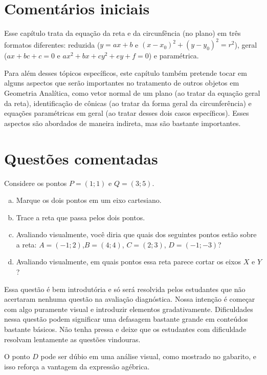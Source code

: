 \documentclass[main_estudante.tex]{subfiles}
\begin{document}
\section{Comentários iniciais}

Esse capítulo trata da equação da reta e da circunfência (no plano) em três formatos diferentes: reduzida ($y=ax+b$ e $(x-x_0)^2+(y-y_0)^2=r^2$), geral ($ax+bc+c=0$ e $ax^2+bx+cy^2+ey+f=0$) e paramétrica.

Para além desses tópicos específicos, este capítulo também pretende tocar em alguns aspectos que serão importantes no tratamento de outros objetos em Geometria Analítica, como vetor normal de um plano (ao tratar da equação geral da reta), identificação de cônicas (ao tratar da forma geral da circunferência) e equações paramétricas em geral (ao tratar desses dois casos específicos). Esses aspectos são abordados de maneira indireta, mas são bastante importantes.

\section{Questões comentadas}

\begin{questao}
Considere os pontos $P=(1;1)$ e $Q=(3;5)$.
\begin{enumerate}[a)]
\item Marque os dois pontos em um eixo cartesiano.
\item Trace a reta que passa pelos dois pontos.
\item Avaliando visualmente, você diria que quais dos seguintes pontos estão sobre a reta: $A=(-1;2)$,$B=(4;4)$, $C=(2;3)$, $D=(-1;-3)$?
\item Avaliando visualmente, em quais pontos essa reta parece cortar os eixos $X$ e $Y$?
\end{enumerate}
\end{questao}

Essa questão é bem introdutória e só será resolvida pelos estudantes que não acertaram nenhuma questão na avaliação diagnóstica. Nossa intenção é começar com algo puramente visual e introduzir elementos gradativamente. Dificuldades nessa questão podem significar uma defasagem bastante grande em conteúdos bastante básicos. Não tenha pressa e deixe que os estudantes com dificuldade resolvam lentamente as questões vindouras.

O ponto $D$ pode ser dúbio em uma análise visual, como mostrado no gabarito, e isso reforça a vantagem da expressão agébrica.
\end{document}
